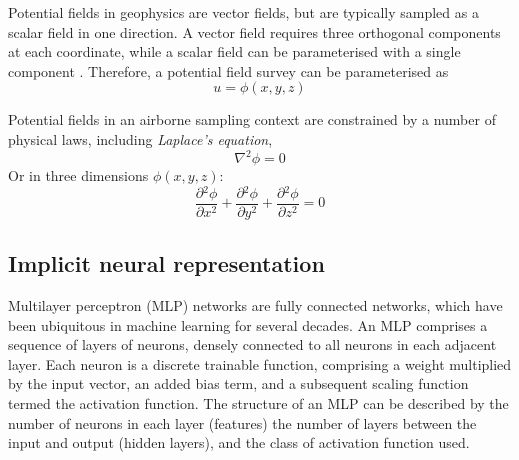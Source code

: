 \documentclass[manuscript.tex]{subfiles}
\begin{document}
\label{sec:geo_physics}
Potential fields in geophysics are vector fields, but are typically sampled as a scalar field in one direction.
A vector field requires three orthogonal components at each coordinate, while a scalar field can be parameterised with a single component \parencite{blakelyPotentialTheoryGravity1996}.
Therefore, a potential field survey can be parameterised as
\begin{equation}
    u = \phi\left(x,y,z\right)
\end{equation}


Potential fields in an airborne sampling context are constrained by a number of physical laws, including \emph{Laplace's equation},
\[
    \nabla^2 \phi = 0
\]
Or in three dimensions \( \phi\left(x,y,z\right) \):
\begin{equation}
    \label{eqn:Laplace}
    \frac{\partial{}^2\phi}{\partial{}x^2} + \frac{\partial{}^2\phi}{\partial{}y^2} + \frac{\partial{}^2\phi}{\partial{}z^2} = 0
\end{equation}



\subsection{Implicit neural representation}
\label{sec:inr}
Multilayer perceptron (MLP) networks are fully connected networks, which have been ubiquitous in machine learning for several decades.
An MLP comprises a sequence of layers of neurons, densely connected to all neurons in each adjacent layer.
Each neuron is a discrete trainable function, comprising a weight multiplied by the input vector, an added bias term, and a subsequent scaling function termed the activation function.
The structure of an MLP can be described by the number of neurons in each layer (features) the number of layers between the input and output (hidden layers), and the class of activation function used.
\end{document}

